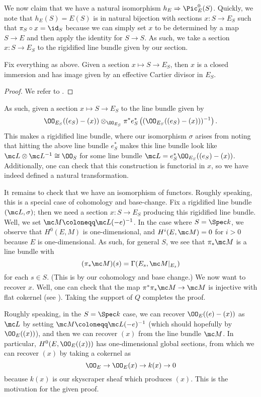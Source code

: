 \documentclass[../notes.tex]{subfiles}
\begin{document}
We now claim that we have a natural isomorphism $h_E\Rightarrow\Pic^0_E(S)$. Quickly, we note that $h_E(S)=E(S)$ is in natural bijection with sections $x\colon S\to E_S$ such that $\pi_S\circ x=\id_S$ because we can simply set $x$ to be determined by a map $S\to E$ and then apply the identity for $S\to S$. As such, we take a section $x\colon S\to E_S$ to the rigidified line bundle given by our section.
\begin{lemma}
	Fix everything as above. Given a section $x\mapsto S\to E_S$, then $x$ is a closed immersion and has image given by an effective Cartier divisor in $E_S$.
\end{lemma}
\begin{proof}
	We refer to \cite[062Y]{stacks}.
\end{proof}
As such, given a section $x\mapsto S\to E_S$ to the line bundle given by
\[\OO_{E_S}((e_S)-(x))\otimes_{\OO_{E_S}}\pi^*e_S^*\left((\OO_{E_S}((e_S)-(x)))^{-1}\right).\]
This makes a rigidified line bundle, where our isomorphism $\sigma$ arises from noting that hitting the above line bundle $e_S^*$ makes this line bundle look like $\mc L\otimes\mc L^{-1}\cong\OO_S$ for some line bundle $\mc L=e_S^*\OO_{E_S}((e_S)-(x))$. Additionally, one can check that this construction is functorial in $x$, so we have indeed defined a natural transformation.

It remains to check that we have an isomorphism of functors. Roughly speaking, this is a special case of cohomology and base-change. Fix a rigidified line bundle $(\mc L,\sigma)$; then we need a section $x\colon S\to E_S$ producing this rigidified line bundle. Well, we set $\mc M\coloneqq\mc L(-e)^{-1}$. In the case where $S=\Spec k$, we observe that $H^0(E,M)$ is one-dimensional, and $H^i(E,\mc M)=0$ for $i>0$ because $E$ is one-dimensional. As such, for general $S$, we see that $\pi_*\mc M$ is a line bundle with
\[(\pi_*\mc M)(s)=\Gamma(E_s,\mc M|_{E_s})\]
for each $s\in S$. (This is by our cohomology and base change.) We now want to recover $x$. Well, one can check that the map $\pi^*\pi_*\mc M\to\mc M$ is injective with flat cokernel (see \cite[00MF]{stacks}). Taking the support of $Q$ completes the proof.
\begin{remark}
	Roughly speaking, in the $S=\Spec k$ case, we can recover $\OO_E((e)-(x))$ as $\mc L$ by setting $\mc M\coloneqq\mc L(-e)^{-1}$ (which should hopefully by $\OO_E((x))$), and then we can recover $(x)$ from the line bundle $\mc M$. In particular, $H^0(E,\OO_E((x)))$ has one-dimensional global sections, from which we can recover $(x)$ by taking a cokernel as
	\[\OO_E\to\OO_E(x)\to k(x)\to0\]
	because $k(x)$ is our skyscraper sheaf which produces $(x)$. This is the motivation for the given proof.
\end{remark}
\end{document}
